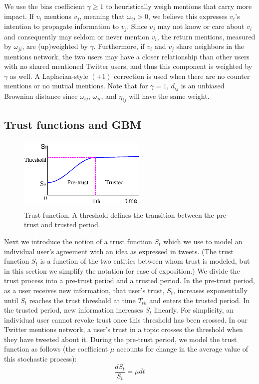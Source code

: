 We use the bias coefficient $\gamma \geq 1$ to heuristically
weigh mentions that carry more impact. If $v_i$ mentions $v_j$, meaning that $\omega_{ij} > 0$, we believe this expresses $v_i$'s intention to propagate information to $v_j$.
Since $v_j$ may not know or care about $v_i$ and consequently may seldom or never mention $v_i$, the return mentions, measured by $\omega_{ji}$, are (up)weighted by $\gamma$.
Furthermore, if $v_i$ and $v_j$ share neighbors in the mentions
network, the two users may have a closer relationship than other users
with no shared mentioned Twitter users, and thus this component
is weighted by $\gamma$ as well. A Laplacian-style $(+1)$ correction is used
when there are no counter mentions or no mutual mentions.
Note that for $\gamma = 1$, $d_{ij}$ is an unbiased Brownian distance since $\omega_{ij}$, $\omega_{ji}$, and $\eta_{ij}$ will have the same weight.

\subsection{Trust functions and GBM}
\begin{figure}[ht]
\centering
\includegraphics[width=2.4in, height=1.4in]{figures/trustFunction.png} %
\caption{Trust function. A threshold defines the transition between the
pre-trust and trusted period.}
\label{fig:subgraph}
\end{figure}

Next we introduce the notion of a
trust function $S_t$ which we use to model an individual user's agreement with an idea as expressed in tweets.
(The trust function $S_t$ is a function of the two entities between whom
trust is modeled, but in this section we simplify the notation for
ease of exposition.)
We divide the trust process into a pre-trust
period and a trusted period.
In the pre-trust period, as a user receives new information, that user's trust, $S_t$, increases exponentially until $S_t$ reaches the trust threshold at time $T_{th}$ and enters the trusted period.
In the trusted period, new information increases $S_t$ linearly. For simplicity, an individual user cannot revoke trust once this threshold has been crossed. In our Twitter mentions network, a user's trust in a topic crosses the threshold when they have tweeted about it. During the pre-trust period, we model the
trust function as follows (the coefficient $\mu$ accounts for change in the average value of this stochastic process):
\begin{equation}\frac{d S_t}{S_t} = \mu {dt}\end{equation}


